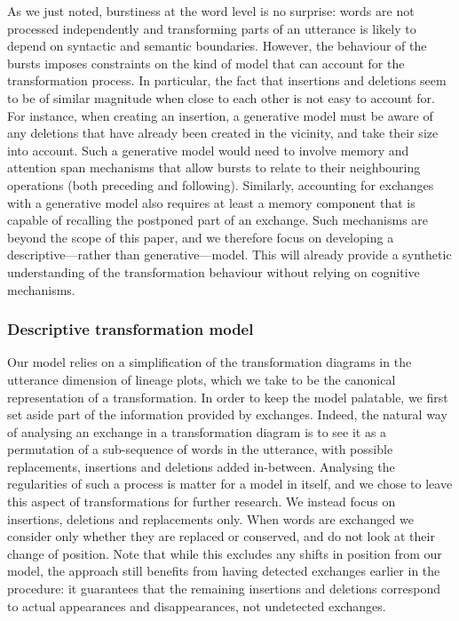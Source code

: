 \documentclass[a4paper,fleqn]{cas-dc}
\begin{document}
As we just noted, burstiness at the word level is no surprise: words are
not processed independently and transforming parts of an utterance is
likely to depend on syntactic and semantic boundaries. However, the
behaviour of the bursts imposes constraints on the kind of model that
can account for the transformation process. In particular, the fact that
insertions and deletions seem to be of similar magnitude when close to
each other is not easy to account for. For instance, when creating an
insertion, a generative model must be aware of any deletions that have
already been created in the vicinity, and take their size into account.
Such a generative model would need to involve memory and attention span
mechanisms that allow bursts to relate to their neighbouring operations
(both preceding and following). Similarly, accounting for exchanges with
a generative model also requires at least a memory component that is
capable of recalling the postponed part of an exchange. Such mechanisms
are beyond the scope of this paper, and we therefore focus on
developing a descriptive---rather than generative---model. This will
already provide
a synthetic understanding of the transformation
behaviour without relying on cognitive mechanisms.

\subsubsection{Descriptive transformation
model}\label{descriptive-transformation-model}

Our model relies on a simplification of the transformation diagrams in
the utterance dimension of lineage plots, which we take to be the
canonical representation of a transformation. In order to keep the model
palatable, we first set aside part of the information provided by
exchanges. Indeed, the natural way of analysing an exchange in a
transformation diagram is to see it as a permutation of a sub-sequence
of words in the utterance, with possible replacements, insertions and
deletions added in-between. Analysing the regularities of such a process
is matter for a model in itself, and we chose to leave this aspect of
transformations for further research. We instead focus on insertions,
deletions and replacements only. When words are exchanged we consider
only whether they are replaced or conserved, and do not look at their
change of position. Note that while this excludes any shifts in position
from our model, the approach still benefits from having detected
exchanges earlier in the procedure: it guarantees that the remaining
insertions and deletions correspond to actual appearances and
disappearances, not undetected exchanges.
\end{document}
